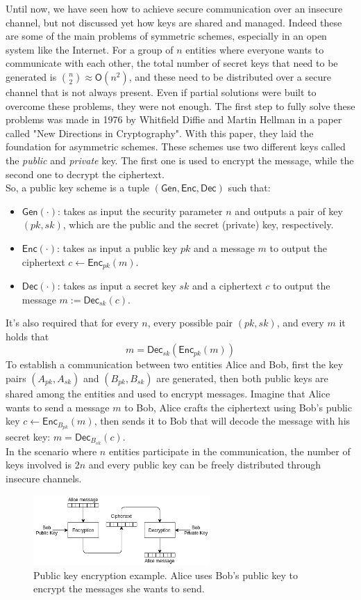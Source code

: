 Until now, we have seen how to achieve secure communication  over an insecure channel, but not discussed yet how keys are shared and managed. Indeed these are some of the main problems of symmetric schemes, especially in an open system like the Internet. For a group of $n$ entities where everyone wants to communicate with each other, the total number of secret keys that need to be generated is $\binom{n}{2} \approx \mathsf{O}(n^2)$, and these need to be distributed over a secure channel that is not always present.
Even if partial solutions were built to overcome these problems, they were not enough.
The first step to fully solve these problems was made in 1976 by Whitfield Diffie and Martin Hellman in a paper called "New Directions in Cryptography". With this paper, they laid the foundation for asymmetric schemes. These schemes use two different keys called the \emph{public} and \emph{private} key. The first one is used to encrypt the message, while the second one to decrypt the ciphertext.\\
So, a public key scheme is a tuple $(\mathsf{Gen}, \mathsf{Enc}, \mathsf{Dec})$ such that:
\begin{itemize}
    \item{$\mathsf{Gen}(\cdot)$: takes as input the security parameter $n$ and outputs a pair of key $(pk, sk)$, which are the public and the secret (private) key, respectively.}
    \item{$\mathsf{Enc}(\cdot)$: takes as input a public key $pk$ and a message $m$ to output the ciphertext $c \leftarrow \mathsf{Enc}_{pk}(m)$.}
    \item{$\mathsf{Dec}(\cdot)$: takes as input a secret key $sk$ and a ciphertext $c$ to output the message $m := \mathsf{Dec}_{sk}(c)$.}
\end{itemize}
It's also required that for every $n$, every possible pair $(pk, sk)$, and every $m$ it holds that
$$
m = \mathsf{Dec}_{sk}(\mathsf{Enc}_{pk}(m))
$$
To establish a communication between two entities Alice and Bob, first the key pairs $(A_{pk}, A_{sk})$ and $(B_{pk}, B_{sk})$ are generated, then both public keys are shared among the entities and used to encrypt messages. Imagine that Alice wants to send a message $m$ to Bob, Alice crafts the ciphertext using Bob's public key $c \leftarrow  \mathsf{Enc}_{B_{pk}}(m)$, then sends it to Bob that will decode the message with his secret key: $m = \mathsf{Dec}_{B_{sk}}(c)$.\\
In the scenario where $n$ entities participate in the communication, the number of keys involved is $2n$ and every public key can be freely distributed through insecure channels.
\begin{figure}[H]
    \centering
    \includegraphics[width=0.6\textwidth]{img/public-key/encryption.png}
    \caption[Public key encryption example.]{Public key encryption example. Alice uses Bob's public key to encrypt the messages she wants to send.}
\end{figure}
